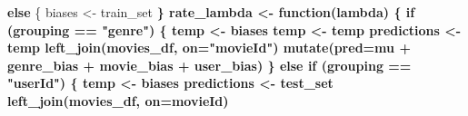 \documentclass[
]{article}
\newenvironment{Shaded}{\begin{snugshade}}{\end{snugshade}}
\newcommand{\ControlFlowTok}[1]{\textcolor[rgb]{0.13,0.29,0.53}{\textbf{#1}}}
\newcommand{\DataTypeTok}[1]{\textcolor[rgb]{0.13,0.29,0.53}{#1}}
\newcommand{\KeywordTok}[1]{\textcolor[rgb]{0.13,0.29,0.53}{\textbf{#1}}}
\newcommand{\NormalTok}[1]{#1}
\newcommand{\OperatorTok}[1]{\textcolor[rgb]{0.81,0.36,0.00}{\textbf{#1}}}
\newcommand{\StringTok}[1]{\textcolor[rgb]{0.31,0.60,0.02}{#1}}
\begin{document}
\begin{Shaded}
\begin{Highlighting}[]
{{{{  \ControlFlowTok{else}\NormalTok{ \{}
\NormalTok{    biases <-}\StringTok{ }\NormalTok{train_set }\OperatorTok{%>%}\StringTok{ }\KeywordTok{group_by}\NormalTok{(}\OperatorTok{!!}\KeywordTok{as.symbol}\NormalTok{(grouping))}
\NormalTok{  \}}
\NormalTok{  rate_lambda <-}\StringTok{ }\ControlFlowTok{function}\NormalTok{(lambda) \{}
    \ControlFlowTok{if}\NormalTok{ (grouping }\OperatorTok{==}\StringTok{ "genre"}\NormalTok{) \{}
\NormalTok{      temp <-}\StringTok{ }\NormalTok{biases }\OperatorTok{%>%}\StringTok{ }\KeywordTok{summarise}\NormalTok{(}\DataTypeTok{genre_bias =} \KeywordTok{sum}\NormalTok{(rating }\OperatorTok{-}\StringTok{ }\NormalTok{movie_bias }\OperatorTok{-}\StringTok{ }\NormalTok{user_bias }\OperatorTok{-}\StringTok{ }\NormalTok{mu)}\OperatorTok{/}\NormalTok{(}\KeywordTok{n}\NormalTok{() }\OperatorTok{+}\StringTok{ }\NormalTok{lambda))}
\NormalTok{      temp <-}\StringTok{ }\NormalTok{temp }\OperatorTok{%>%}\StringTok{ }\KeywordTok{inner_join}\NormalTok{(test_genre_ratings_df, }\DataTypeTok{on=}\NormalTok{genres)}
\NormalTok{      predictions <-}\StringTok{ }\NormalTok{temp }\OperatorTok{%>%}\StringTok{ }
\StringTok{        }\KeywordTok{left_join}\NormalTok{(movies_df, }\DataTypeTok{on=}\StringTok{"movieId"}\NormalTok{) }\OperatorTok{%>%}\StringTok{ }\KeywordTok{left_join}\NormalTok{(users_df, }\DataTypeTok{on=}\StringTok{"userId"}\NormalTok{) }\OperatorTok{%>%}
\StringTok{        }\KeywordTok{mutate}\NormalTok{(}\DataTypeTok{pred=}\NormalTok{mu }\OperatorTok{+}\StringTok{ }\NormalTok{genre_bias }\OperatorTok{+}\StringTok{ }\NormalTok{movie_bias }\OperatorTok{+}\StringTok{ }\NormalTok{user_bias)}
\NormalTok{    \}}
    \ControlFlowTok{else} \ControlFlowTok{if}\NormalTok{ (grouping }\OperatorTok{==}\StringTok{ "userId"}\NormalTok{) \{}
\NormalTok{      temp <-}\StringTok{ }\NormalTok{biases }\OperatorTok{%>%}\StringTok{ }\KeywordTok{summarise}\NormalTok{(}\DataTypeTok{user_bias =} \KeywordTok{sum}\NormalTok{(rating }\OperatorTok{-}\StringTok{ }\NormalTok{movie_bias }\OperatorTok{-}\StringTok{ }\NormalTok{mu)}\OperatorTok{/}\NormalTok{(}\KeywordTok{n}\NormalTok{() }\OperatorTok{+}\StringTok{ }\NormalTok{lambda))}
\NormalTok{      predictions <-}\StringTok{ }\NormalTok{test_set }\OperatorTok{%>%}\StringTok{ }\KeywordTok{inner_join}\NormalTok{(temp, }\DataTypeTok{on=}\OperatorTok{!!}\KeywordTok{as.symbol}\NormalTok{(grouping)) }\OperatorTok{%>%}\StringTok{ }
\StringTok{        }\KeywordTok{left_join}\NormalTok{(movies_df, }\DataTypeTok{on=}\NormalTok{movieId) }\OperatorTok{%>%}\StringTok{ }\KeywordTok{mutate}\NormalTok{(}\DataTypeTok{pred =}\NormalTok{ mu }\OperatorTok{+}\StringTok{ }\NormalTok{movie_bias }\OperatorTok{+}\StringTok{ }\NormalTok{user_bias) }\OperatorTok{%>%}\StringTok{ }\KeywordTok{select}\NormalTok{(rating, pred)}
}}}}}}}}}}}}
\end{Highlighting}
\end{Shaded}
\end{document}
